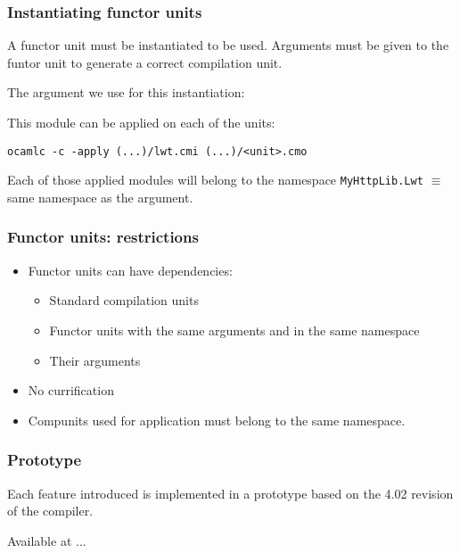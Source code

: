 \documentclass{beamer}
\begin{document}
\begin{frame}[fragile]
\frametitle{Instantiating functor units}

 {
  A functor unit must be instantiated to be used. Arguments must be given to the
  funtor unit to generate a correct compilation unit.
}


 {
  The argument we use for this instantiation:
  \medskip
  \lwtbinding
}

 {
  This module can be applied on each of the units:
  
  \begin{block}{}
    \texttt{ocamlc -c -apply (...)/lwt.cmi (...)/<unit>.cmo}
  \end{block}

  \medskip

  Each of those applied modules will belong to the namespace
  \texttt{MyHttpLib.Lwt} $\equiv$ same namespace as the argument. 
}

\end{frame}


\begin{frame}
\frametitle{Functor units: restrictions}
\begin{itemize}[<+->]
\item Functor units can have dependencies:
  \begin{itemize}
    \item Standard compilation units
    \item Functor units with the \alert{same arguments} and in the \alert{same namespace}
    \item Their arguments
  \end{itemize}
\item No currification
\item Compunits used for application must belong to the same namespace.
\end{itemize}
\end{frame}

\begin{frame}
\frametitle{Prototype}

Each feature introduced is implemented in a prototype based on the 4.02
revision of the compiler.

Available at ... 
\end{frame}
\end{document}
